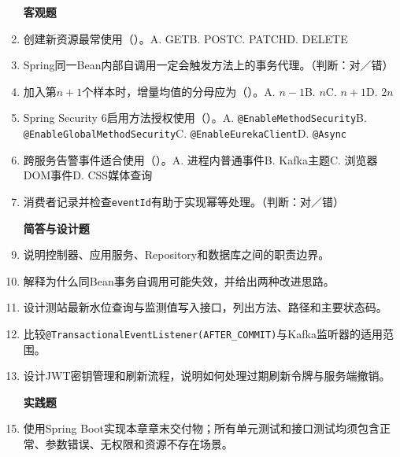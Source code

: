 \begin{enumerate}
\item[\textbf{客观题}]
\item 创建新资源最常使用（\quad）。A. GET\quad B. POST\quad C. PATCH\quad D. DELETE
\item Spring同一Bean内部自调用一定会触发方法上的事务代理。（判断：对／错）
\item 加入第$n+1$个样本时，增量均值的分母应为（\quad）。A. $n-1$\quad B. $n$\quad C. $n+1$\quad D. $2n$
\item Spring Security 6启用方法授权使用（\quad）。A. \texttt{@EnableMethodSecurity}\quad B. \texttt{@EnableGlobalMethodSecurity}\quad C. \texttt{@EnableEurekaClient}\quad D. \texttt{@Async}
\item 跨服务告警事件适合使用（\quad）。A. 进程内普通事件\quad B. Kafka主题\quad C. 浏览器DOM事件\quad D. CSS媒体查询
\item 消费者记录并检查\texttt{eventId}有助于实现幂等处理。（判断：对／错）

\item[\textbf{简答与设计题}]
\item 说明控制器、应用服务、Repository和数据库之间的职责边界。
\item 解释为什么同Bean事务自调用可能失效，并给出两种改进思路。
\item 设计测站最新水位查询与监测值写入接口，列出方法、路径和主要状态码。
\item 比较\texttt{@TransactionalEventListener(AFTER\_COMMIT)}与Kafka监听器的适用范围。
\item 设计JWT密钥管理和刷新流程，说明如何处理过期刷新令牌与服务端撤销。

\item[\textbf{实践题}]
\item 使用Spring Boot实现本章章末交付物；所有单元测试和接口测试均须包含正常、参数错误、无权限和资源不存在场景。
\end{enumerate}

